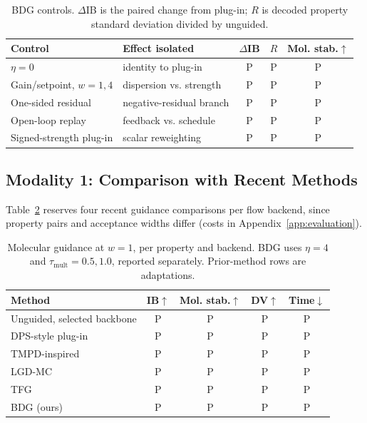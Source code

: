 \documentclass{article}
\newcommand{\pend}{\textcolor{black!60}{\textsf{P}}}
\begin{document}
\begin{table}[!htbp]
\centering\small
\caption{BDG controls. $\Delta$IB is the paired change from plug-in; $R$ is decoded property standard deviation divided by unguided.}
\label{tab:ablation}
\begin{tabular}{llccc}
\toprule
Control & Effect isolated & $\Delta$IB & $R$ & Mol. stab.$\uparrow$\\
\midrule
$\eta=0$ & identity to plug-in & \pend & \pend & \pend\\
Gain/setpoint, $w=1,4$ & dispersion vs. strength & \pend & \pend & \pend\\
One-sided residual & negative-residual branch & \pend & \pend & \pend\\
Open-loop replay & feedback vs. schedule & \pend & \pend & \pend\\
Signed-strength plug-in & scalar reweighting & \pend & \pend & \pend\\
\bottomrule
\end{tabular}
\end{table}


\subsection{Modality 1: Comparison with Recent Methods}\label{sec:recent}
Table~\ref{tab:recent} reserves four recent guidance comparisons per flow backend, since property pairs and acceptance widths differ (costs in Appendix~\ref{app:evaluation}).

\begin{table}[!htbp]
\centering\small
\caption{Molecular guidance at $w=1$, per property and backend. BDG uses $\eta=4$ and $\tau_{\mathrm{mult}}=0.5,1.0$, reported separately. Prior-method rows are adaptations.}
\label{tab:recent}
\begin{tabular}{lcccc}
\toprule
Method & IB$\uparrow$ & Mol. stab.$\uparrow$ & DV$\uparrow$ & Time$\downarrow$\\
\midrule
Unguided, selected backbone & \pend & \pend & \pend & \pend\\
\midrule
DPS-style plug-in \citep{chung2023dps} & \pend & \pend & \pend & \pend\\
TMPD-inspired \citep{boys2024tmpd} & \pend & \pend & \pend & \pend\\
LGD-MC \citep{song2023lgd} & \pend & \pend & \pend & \pend\\
TFG \citep{ye2024tfg} & \pend & \pend & \pend & \pend\\
BDG (ours) & \pend & \pend & \pend & \pend\\
\bottomrule
\end{tabular}
\end{table}
\end{document}
